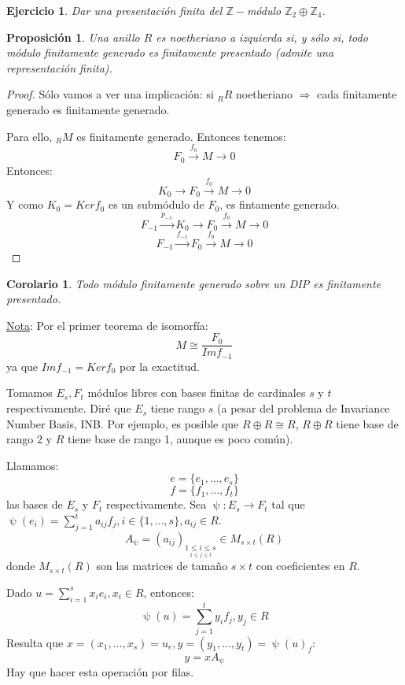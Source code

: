 \documentclass[11pt,a4paper]{article}
\theoremstyle{break}
\newtheorem{corollary}[theorem]{Corolario}
\newtheorem{proposition}[theorem]{Proposición}
\newtheorem{task}[theorem]{Ejercicio}
\begin{document}
\begin{task}
Dar una presentación finita del $\mathbb{Z}-$módulo $\mathbb{Z}_{2} \oplus \mathbb{Z}_{4}$.
\end{task}

\begin{proposition}
Una anillo $R$ es noetheriano a izquierda si, y sólo si, todo módulo finitamente generado es finitamente presentado (admite una representación finita).
\end{proposition}

\begin{proof}
Sólo vamos a ver una implicación: si $_{R}R$ noetheriano $\Rightarrow$ cada finitamente generado es finitamente generado.

Para ello, $_{R}M$ es finitamente generado. Entonces tenemos:
$$F_{0} \overset{f_{0}}{\to} M \to 0$$
Entonces:
$$K_{0} \to F_{0} \overset{f_{0}}{\to} M \to 0$$
Y como $K_{0} = Ker f_{0}$ es un submódulo de $F_{0}$, es fintamente generado.
$$F_{-1} \overset{p_{-1}}{\to} K_{0} \to F_{0} \overset{f_{0}}{\to} M \to 0$$
$$F_{-1} \overset{f_{-1}}{\to} F_{0} \overset{f_{0}}{\to} M \to 0$$
\end{proof}

\begin{corollary}
Todo módulo finitamente generado sobre un DIP es finitamente presentado.
\end{corollary}

\underline{Nota}: Por el primer teorema de isomorfía:
$$M \cong \frac{F_{0}}{Im f_{-1}}$$
ya que $Im f_{-1} = Ker f_{0}$ por la exactitud.

Tomamos $E_{s}, F_{t}$ módulos libres con bases finitas de cardinales $s$ y $t$ respectivamente. Diré que $E_{s}$ tiene rango $s$ (a pesar del problema de Invariance Number Basis, INB. Por ejemplo, es posible que $R \oplus R \cong R$, $R \oplus R$ tiene base de rango 2 y $R$ tiene base de rango 1, aunque es poco común).

Llamamos:
$$e = \{e_{1}, \dots, e_{s}\}$$
$$f = \{f_{1}, \dots, f_{t}\}$$
las bases de $E_{s}$ y $F_{t}$ respectivamente. Sea $\uppsi: E_{s} \to F_{t}$ tal que $\uppsi(e_{i}) = \sum\limits_{j=1}^{t} a_{ij}f_{j}, i \in \{1, \dots, s\}, a_{ij} \in R$.
$$A_{\uppsi} = (a_{ij})_{\underset{1 \leq j \leq t}{1 \leq i \leq s}} \in M_{s \times t}(R)$$
donde $M_{s \times t}(R)$ son las matrices de tamaño $s \times t$ con coeficientes en $R$.

Dado $u = \sum\limits_{i=1}^{s} x_{i}e_{i}, x_{i} \in R$, entonces:
$$\uppsi(u) = \sum\limits_{j=1}^{t} y_{i}f_{j}, y_{j} \in R$$
Resulta que $x = (x_{1}, \dots, x_{s}) = u_{e}, y = (y_{1}, \dots, y_{t}) = \uppsi(u)_{f}$:
$$y = x A_{\uppsi}$$
Hay que hacer esta operación por filas.
\end{document}
